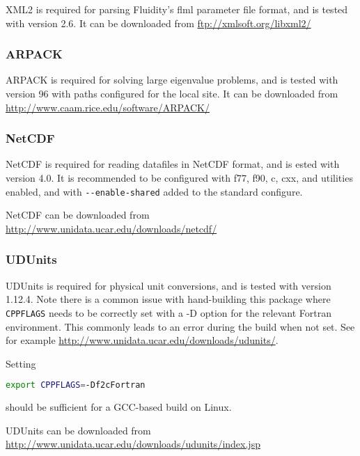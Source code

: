 XML2 is required for parsing Fluidity's flml parameter file format, and is
tested with version 2.6. It can be downloaded from \url{ftp://xmlsoft.org/libxml2/}

\subsubsection{ARPACK}
\label{sec:required_libraries_supporting_arpack}

ARPACK is required for solving large eigenvalue problems, and is tested with
version 96 with paths configured for the local site. It can be downloaded from
\url{http://www.caam.rice.edu/software/ARPACK/}

\subsubsection{NetCDF}
\label{sec:required_libraries_supporting_netcdf}

NetCDF is required for reading datafiles in NetCDF format, and is ested with
version 4.0. It is recommended to be configured with f77, f90, c, cxx, and
utilities enabled, and with \lstinline[language=bash]+--enable-shared+ added to
the standard configure. 

NetCDF can be downloaded from \url{http://www.unidata.ucar.edu/downloads/netcdf/}

\subsubsection{UDUnits}
\label{sec:required_libraries_supporting_udunits}

UDUnits is required for physical unit conversions, and is tested with version
1.12.4. Note there is a common issue with hand-building this package where
\lstinline[language=bash]+CPPFLAGS+ needs to be correctly set with a -D
option for the relevant Fortran environment. This commonly leads to an error
during the build when not set. See for example
\url{http://www.unidata.ucar.edu/downloads/udunits/}.

Setting

\begin{lstlisting}[language=bash]
export CPPFLAGS=-Df2cFortran
\end{lstlisting}

should be sufficient for a GCC-based build on Linux.

UDUnits can be downloaded from \url{http://www.unidata.ucar.edu/downloads/udunits/index.jsp}

